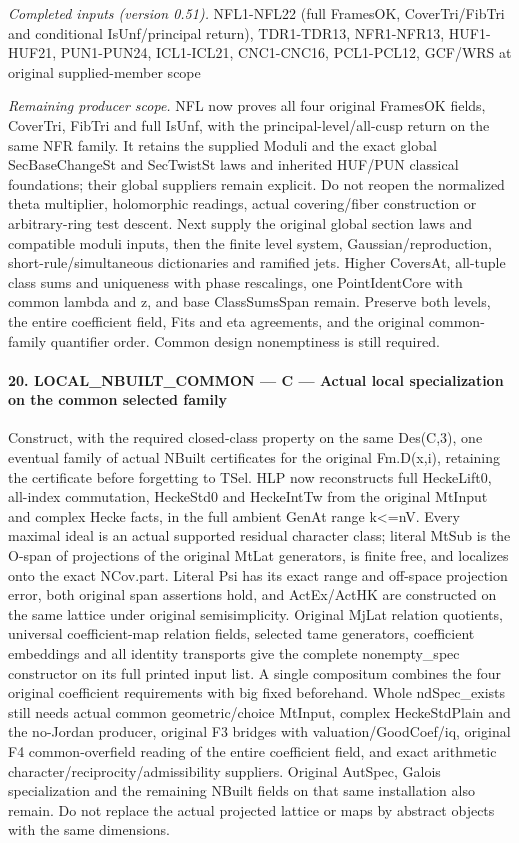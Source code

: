 \emph{Completed inputs (version 0.51).} NFL1-NFL22 (full FramesOK, CoverTri/FibTri and conditional IsUnf/principal return), TDR1-TDR13, NFR1-NFR13, HUF1-HUF21, PUN1-PUN24, ICL1-ICL21, CNC1-CNC16, PCL1-PCL12, GCF/WRS at original supplied-member scope

\emph{Remaining producer scope.} NFL now proves all four original FramesOK fields, CoverTri, FibTri and full IsUnf, with the principal-level/all-cusp return on the same NFR family. It retains the supplied Moduli and the exact global SecBaseChangeSt and SecTwistSt laws and inherited HUF/PUN classical foundations; their global suppliers remain explicit. Do not reopen the normalized theta multiplier, holomorphic readings, actual covering/fiber construction or arbitrary-ring test descent. Next supply the original global section laws and compatible moduli inputs, then the finite level system, Gaussian/reproduction, short-rule/simultaneous dictionaries and ramified jets. Higher CoversAt, all-tuple class sums and uniqueness with phase rescalings, one PointIdentCore with common lambda and z, and base ClassSumsSpan remain. Preserve both levels, the entire coefficient field, Fits and eta agreements, and the original common-family quantifier order. Common design nonemptiness is still required.



\paragraph{20. LOCAL\_\allowbreak NBUILT\_\allowbreak COMMON — C — Actual local specialization on the common selected family}

Construct, with the required closed-class property on the same Des(C,3), one eventual family of actual NBuilt certificates for the original Fm.D(x,i), retaining the certificate before forgetting to TSel. HLP now reconstructs full HeckeLift0, all-index commutation, HeckeStd0 and HeckeIntTw from the original MtInput and complex Hecke facts, in the full ambient GenAt range k<=nV. Every maximal ideal is an actual supported residual character class; literal MtSub is the O-span of projections of the original MtLat generators, is finite free, and localizes onto the exact NCov.part. Literal Psi has its exact range and off-space projection error, both original span assertions hold, and ActEx/ActHK are constructed on the same lattice under original semisimplicity. Original MjLat relation quotients, universal coefficient-map relation fields, selected tame generators, coefficient embeddings and all identity transports give the complete nonempty\_\allowbreak spec constructor on its full printed input list. A single compositum combines the four original coefficient requirements with big fixed beforehand. Whole ndSpec\_\allowbreak exists still needs actual common geometric/choice MtInput, complex HeckeStdPlain and the no-Jordan producer, original F3 bridges with valuation/GoodCoef/iq, original F4 common-overfield reading of the entire coefficient field, and exact arithmetic character/reciprocity/admissibility suppliers. Original AutSpec, Galois specialization and the remaining NBuilt fields on that same installation also remain. Do not replace the actual projected lattice or maps by abstract objects with the same dimensions.

